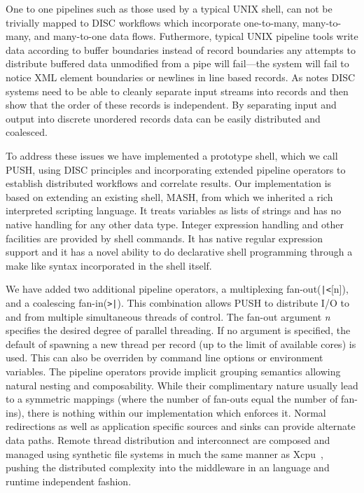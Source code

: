 \documentclass[11pt, letterpaper]{article}
\begin{document}
One to one pipelines such as those used by a typical UNIX shell, can not be 
trivially mapped to DISC workflows which incorporate one-to-many, many-to-many,
and many-to-one data flows. 
Futhermore, typical UNIX pipeline tools write data according to buffer 
boundaries instead of record boundaries any attempts to distribute buffered 
data unmodified from a pipe will fail---the system will fail to notice XML 
element boundaries or newlines in line based records. 
As \cite{pike2005idp} notes DISC systems need to be able to cleanly separate 
input streams into records and then show that the order of these records is 
independent. 
By separating input and output into discrete unordered records data can be 
easily distributed and coalesced.

To address these issues we have implemented a prototype shell, 
which we call PUSH, using DISC principles and incorporating extended 
pipeline operators to establish distributed workflows and correlate results.
Our implementation is based on extending an existing shell, MASH\cite{mashman}, 
from which we inherited a rich interpreted scripting language. 
It treats variables as lists of strings and has no native handling for any 
other data type. 
Integer expression handling and other facilities are provided by shell commands. 
It has native regular expression support and it has a novel ability to do 
declarative shell programming through a make like syntax incorporated in the 
shell itself.

We have added two additional pipeline operators, 
a multiplexing fan-out(\verb!|<![n]), and a coalescing fan-in(\verb!>|!). 
This combination allows PUSH to distribute I/O to and from multiple
simultaneous threads of control.
The fan-out argument \emph{n} specifies the desired degree of parallel 
threading.  If no argument is specified, the default of spawning a new
thread per record (up to the limit of available cores) is used.  This can
also be overriden by command line options or environment variables.
The pipeline operators provide implicit grouping semantics allowing natural 
nesting and composability.
While their complimentary nature usually lead to a symmetric
mappings (where the number of fan-outs equal the number of fan-ins), there is 
nothing within our implementation which enforces it.
Normal redirections as well as application specific sources and sinks 
can provide alternate data paths.
Remote thread distribution and interconnect are composed and managed
using synthetic file systems in much the same manner as Xcpu~\cite{xcpu}, 
pushing the distributed complexity into the middleware in an language and 
runtime independent fashion.
\end{document}
